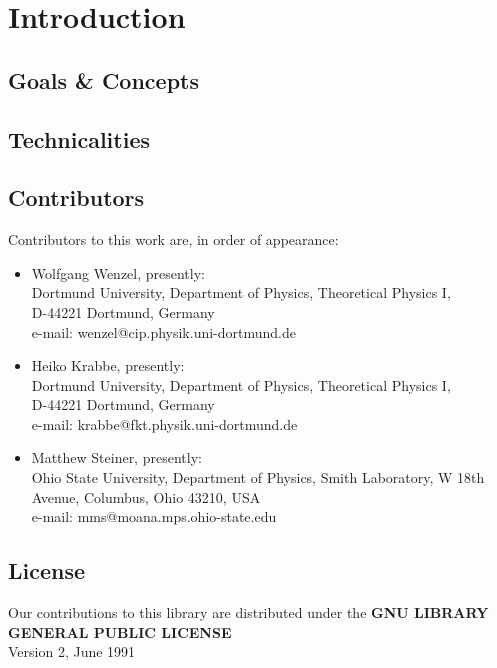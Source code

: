
\chapter{Introduction}

\section{Goals \& Concepts}

\section{Technicalities}

\section{Contributors}
Contributors to this work are, in order of appearance:
\begin{itemize}
\item Wolfgang Wenzel, presently: \\
      Dortmund University, Department of Physics, Theoretical Physics I, \\
      D-44221 Dortmund, Germany \\
      e-mail: wenzel@cip.physik.uni-dortmund.de 
\item Heiko Krabbe, presently: \\
      Dortmund University, Department of Physics, Theoretical Physics I, \\ 
      D-44221 Dortmund, Germany  \\ 
      e-mail: krabbe@fkt.physik.uni-dortmund.de 
\item Matthew Steiner, presently: \\
      Ohio State University, Department of Physics, Smith Laboratory, 
      W 18th Avenue, Columbus, Ohio 43210, USA \\
      e-mail: mms@moana.mps.ohio-state.edu
\end{itemize}

\section{License}

Our contributions to this library are distributed under the 
\bc
  {\bf GNU LIBRARY GENERAL PUBLIC LICENSE} \\[0.3em]
		       Version 2, June 1991\\[0.5em]

